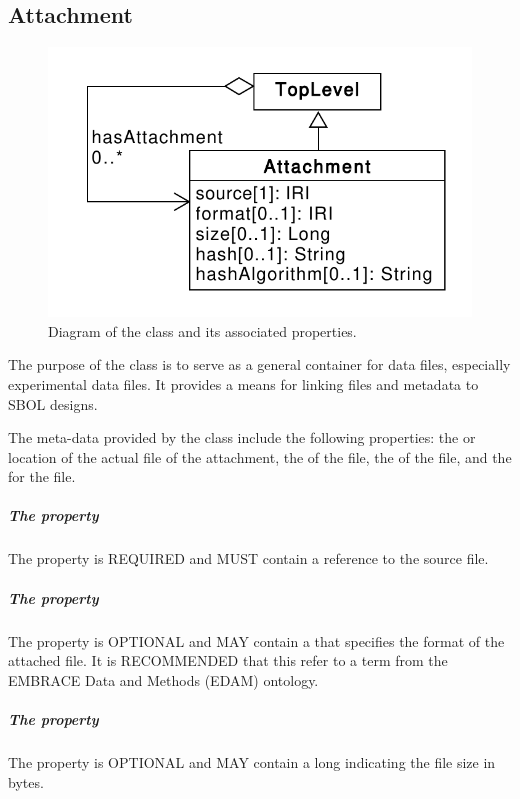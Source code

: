 
\subsection{Attachment}
\label{sec:Attachment}

\begin{figure}[ht]
\begin{center}
\includegraphics[scale=0.6]{uml/attachment}
\caption[]{Diagram of the  class and its associated properties.}
\label{uml:attachment}
\end{center}
\end{figure}

The purpose of the  class is to serve as a general container for data files, especially experimental data files.
It provides a means for linking files and metadata to SBOL designs.

The meta-data provided by the  class include the following properties: the  or location of the actual file of the attachment, the  of the file, the  of the file, and the  for the file.

\subparagraph{The  property}\label{sec:source:A}
The  property is REQUIRED and MUST contain a  reference to the source file.

\subparagraph{The  property}\label{sec:format}
The  property is OPTIONAL and MAY contain a  that specifies the format of the attached file. It is RECOMMENDED that this  refer to a term from the EMBRACE Data and Methods (EDAM) ontology.

\subparagraph{The  property}\label{sec:size}
The  property is OPTIONAL and MAY contain a long indicating the file size in bytes.

